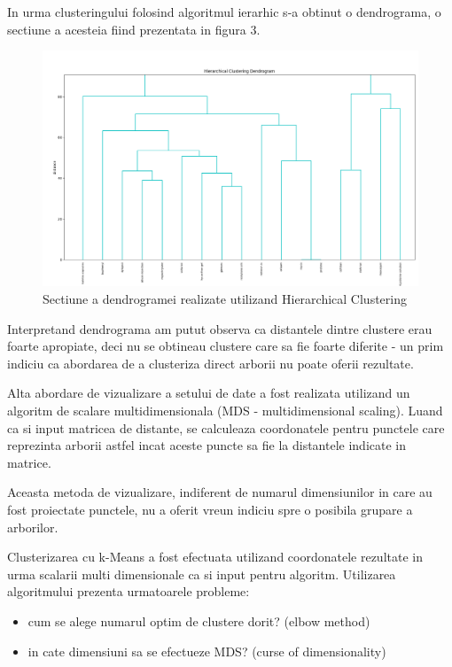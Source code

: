 \documentclass[a4paper,12pt]{article}
\begin{document}
In urma clusteringului folosind algoritmul ierarhic s-a obtinut o dendrograma, o sectiune a acesteia fiind prezentata in figura 3.
\clearpage
\begin{figure}[h]
\centering
 \includegraphics[width=16cm]{Hierarchical.png}
 \caption{Sectiune a dendrogramei realizate utilizand Hierarchical Clustering}
 \end{figure}

Interpretand dendrograma am putut observa ca distantele dintre clustere erau foarte apropiate, deci nu se obtineau clustere care sa fie foarte diferite - un prim indiciu ca abordarea de a clusteriza direct arborii nu poate oferii rezultate.

Alta abordare de vizualizare a setului de date a fost realizata utilizand un algoritm de scalare multidimensionala (MDS - multidimensional scaling). Luand ca si input matricea de distante, se calculeaza coordonatele pentru punctele care reprezinta arborii astfel incat aceste puncte sa fie la distantele indicate in matrice. 

Aceasta metoda de vizualizare, indiferent de numarul dimensiunilor in care au fost proiectate punctele, nu a oferit vreun indiciu spre o posibila grupare a arborilor.

Clusterizarea cu k-Means a fost efectuata utilizand coordonatele rezultate in urma scalarii multi dimensionale ca si input pentru algoritm. Utilizarea algoritmului prezenta urmatoarele probleme:
\begin{itemize}
\item cum se alege numarul optim de clustere dorit? (elbow method)
\item in cate dimensiuni sa se efectueze MDS? (curse of dimensionality)
\end{itemize}
\end{document}
